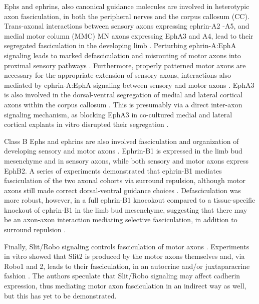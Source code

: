 Ephs and ephrins, also canonical guidance molecules \cite{bashaw2010signaling,kolodkin2011mechanisms} are involved in heterotypic axon fasciculation, in both the peripheral nerves and the corpus callosum (CC).
Trans-axonal interactions between sensory axons expressing ephrin-A2 -A5, and medial motor column (MMC) MN axons expressing EphA3 and A4, lead to their segregated fasciculation in the developing limb \cite{gallarda2008segregation}.
Perturbing ephrin-A:EphA signaling leads to marked defasciculation and misrouting of motor axons into proximal sensory pathways \cite{gallarda2008segregation}.
Furthermore, properly patterned motor axons are necessary for the appropriate extension of sensory axons, interactions also mediated by ephrin-A:EphA signaling between sensory and motor axons \cite{wang2011anatomical}.
EphA3 is also involved in the dorsal-ventral segregation of medial and lateral cortical axons within the corpus callosum \cite{nishikimi2011segregation}.
This is presumably via a direct inter-axon signaling mechanism, as blocking EphA3 in co-cultured medial and lateral cortical explants in vitro disrupted their segregation \cite{nishikimi2011segregation}.

Class B Ephs and ephrins are also involved fasciculation and organization of developing sensory and motor axons \cite{luxey2013eph}.
Ephrin-B1 is expressed in the limb bud mesenchyme and in sensory axons, while both sensory and motor axons express EphB2.
A series of experiments demonstrated that ephrin-B1 mediates fasciculation of the two axonal cohorts via surround repulsion, although motor axons still made correct dorsal-ventral guidance choices \cite{luxey2013eph}.
Defasciculation was more robust, however, in a full ephrin-B1 knocokout compared to a tissue-specific knockout of ephrin-B1 in the limb bud mesenchyme, suggesting that there may be an axon-axon interaction mediating selective fasciculation, in addition to surround repulsion \cite{luxey2013eph}.

Finally, Slit/Robo signaling controls fasciculation of motor axons \cite{jaworski2012autocrine}.
Experiments in vitro showed that Slit2 is produced by the motor axons themselves and, via Robo1 and 2, leads to their fasciculation, in an autocrine and/or juxtaparacrine fashion \cite{jaworski2012autocrine}.
The authors speculate that Slit/Robo signaling may affect cadherin expression, thus mediating motor axon fasciculation in an indirect way as well, but this has yet to be demonstrated.